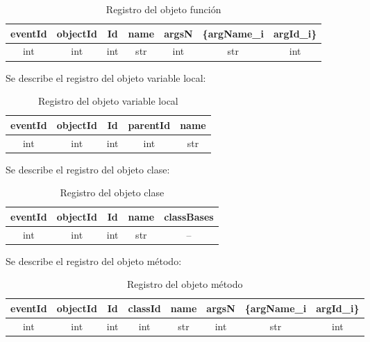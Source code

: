 \documentclass[10pt,a4paper]{article}
\begin{document}
\begin{table}[!h]
\begin{center}
\begin{tabular}{| c | c | c | c | c | c | c |}
\hline
eventId & objectId & Id & name & argsN & \{argName_{i} & argId_{i}\}\\
\hline
int & int & int & str & int & str & int \\
\hline
\end{tabular}
\caption{Registro del objeto función} 
\end{center}
\end{table}


Se describe el registro del objeto variable local:\\

\begin{table}[!h]
\begin{center}
\begin{tabular}{| c | c | c | c | c |}
\hline
eventId & objectId & Id & parentId & name\\
\hline
int & int & int & int & str\\
\hline
\end{tabular}
\caption{Registro del objeto variable local} 
\end{center}
\end{table}


Se describe el registro del objeto clase:\\

\begin{table}[!h]
\begin{center}
\begin{tabular}{| c | c | c | c | c |}
\hline
eventId & objectId & Id & name & classBases\\
\hline
int & int & int & str & --\footnotemark[1]\\
\hline
\end{tabular}
\caption{Registro del objeto clase} 
\end{center}
\end{table}


\newpage
Se describe el registro del objeto método:\\

\begin{table}[!h]
\begin{center}
\begin{tabular}{| c | c | c | c | c | c | c | c |}
\hline
eventId & objectId & Id & classId & name & argsN & \{argName_{i} & argId_{i}\}\\
\hline
int & int & int & int & str & int & str & int \\
\hline
\end{tabular}
\caption{Registro del objeto método} 
\end{center}
\end{table}
\end{document}

